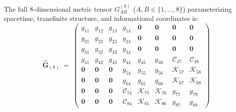 \documentclass[
    12pt,
    a4paper,
    headings=normal,
    twoside=false,
    open=any,
    parskip=half
]{scrbook}
\begin{document}
The full 8-dimensional metric tensor $G_{AB}^{(8)}$ ($A, B \in \{1, \dots, 8\}$) parameterizing spacetime, transfinite structure, and informational coordinates is:
\begin{equation}
\hat{\mathbf{G}}_{(8)} \;=\; \begin{pmatrix}
g_{11} & g_{12} & g_{13} & g_{14} & \mathbf{0} & \mathbf{0} & \mathbf{0} & \mathbf{0} \\
g_{21} & g_{22} & g_{23} & g_{24} & \mathbf{0} & \mathbf{0} & \mathbf{0} & \mathbf{0} \\
g_{31} & g_{32} & g_{33} & g_{34} & \mathbf{0} & \mathbf{0} & \mathbf{0} & \mathbf{0} \\
g_{41} & g_{42} & g_{43} & g_{44} & g_{45} & g_{46} & \mathcal{C}_{47} & \mathcal{C}_{48} \\
\mathbf{0} & \mathbf{0} & \mathbf{0} & g_{54} & g_{55} & g_{56} & \mathcal{K}_{57} & \mathcal{K}_{58} \\
\mathbf{0} & \mathbf{0} & \mathbf{0} & g_{64} & g_{65} & g_{66} & \mathcal{K}_{67} & \mathcal{K}_{68} \\
\mathbf{0} & \mathbf{0} & \mathbf{0} & \mathcal{C}_{74} & \mathcal{K}_{75} & \mathcal{K}_{76} & g_{77} & g_{78} \\
\mathbf{0} & \mathbf{0} & \mathbf{0} & \mathcal{C}_{84} & \mathcal{K}_{85} & \mathcal{K}_{86} & g_{87} & g_{88}
\end{pmatrix}
\label{eq:ch10_8x8_metric_matrix}
\end{equation}
\end{document}
